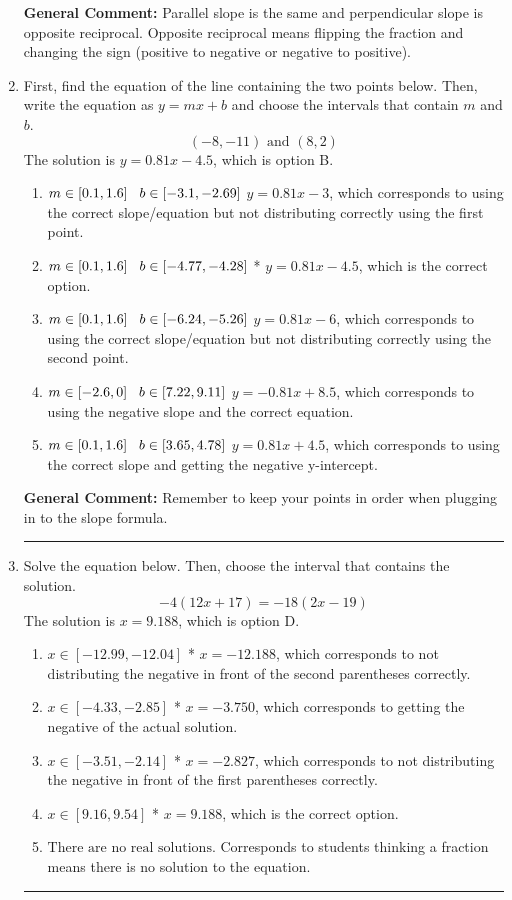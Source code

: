 \documentclass{extbook}[14pt]
\newcommand{\litem}[1]{\item #1

\rule{\textwidth}{0.4pt}}
\begin{document}
\begin{enumerate}
{\textbf{General Comment:} Parallel slope is the same and perpendicular slope is opposite reciprocal. Opposite reciprocal means flipping the fraction and changing the sign (positive to negative or negative to positive).
}
\litem{
First, find the equation of the line containing the two points below. Then, write the equation as $ y=mx+b $ and choose the intervals that contain $m$ and $b$.
\[ (-8, -11) \text{ and } (8, 2) \]
The solution is \( y = 0.81x -4.5 \), which is option B.\begin{enumerate}[label=\Alph*.]
\item \( m \in [0.1, 1.6] \hspace*{3mm} b \in [-3.1, -2.69] \)
 $y = 0.81x -3$, which corresponds to using the correct slope/equation but not distributing correctly using the first point.
\item \( m \in [0.1, 1.6] \hspace*{3mm} b \in [-4.77, -4.28] \)
* $y = 0.81x -4.5$, which is the correct option.
\item \( m \in [0.1, 1.6] \hspace*{3mm} b \in [-6.24, -5.26] \)
 $y = 0.81x -6$, which corresponds to using the correct slope/equation but not distributing correctly using the second point.
\item \( m \in [-2.6, 0] \hspace*{3mm} b \in [7.22, 9.11] \)
 $y = -0.81x + 8.5$, which corresponds to using the negative slope and the correct equation.
\item \( m \in [0.1, 1.6] \hspace*{3mm} b \in [3.65, 4.78] \)
 $y = 0.81x + 4.5$, which corresponds to using the correct slope and getting the negative y-intercept.
\end{enumerate}

\textbf{General Comment:} Remember to keep your points in order when plugging in to the slope formula.
}
\litem{
Solve the equation below. Then, choose the interval that contains the solution.
\[ -4(12x + 17) = -18(2x -19) \]
The solution is \( x = 9.188 \), which is option D.\begin{enumerate}[label=\Alph*.]
\item \( x \in [-12.99, -12.04] \)
* $x = -12.188$, which corresponds to not distributing the negative in front of the second parentheses correctly.
\item \( x \in [-4.33, -2.85] \)
* $x = -3.750$, which corresponds to getting the negative of the actual solution.
\item \( x \in [-3.51, -2.14] \)
* $x = -2.827$, which corresponds to not distributing the negative in front of the first parentheses correctly.
\item \( x \in [9.16, 9.54] \)
* $x = 9.188$, which is the correct option.
\item \( \text{There are no real solutions.} \)
Corresponds to students thinking a fraction means there is no solution to the equation.
\end{enumerate}

}
\end{enumerate}
\end{document}
